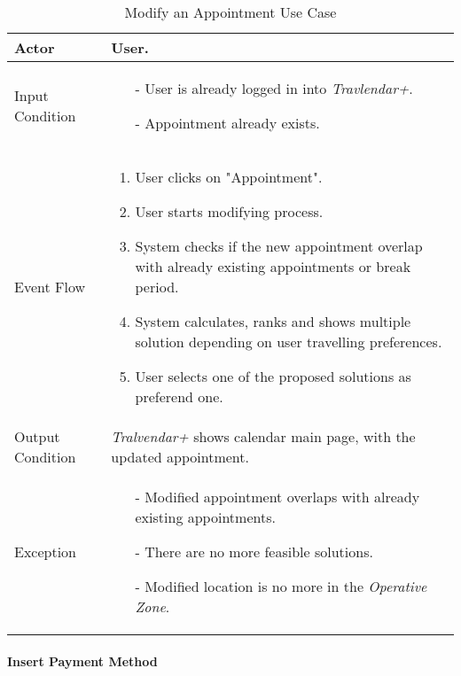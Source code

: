 		\begin{table}[H]
			\begin{tabular}{| l | p{} | }
				\hline
				\hline
				Actor	&		User. \\
				\hline
				Input Condition		&		\begin{itemize}
														\item[-] User is already logged in into \textit{Travlendar+}.
														\item[-] Appointment already exists.
													\end{itemize} \\
				\hline
				Event Flow		&		\begin{enumerate}
													\item User clicks on "Appointment".
													\item User starts modifying process.
													\item System checks if the new appointment overlap with already existing appointments or break period.
													\item	 System calculates, ranks and shows multiple solution depending on user travelling preferences.
													\item User selects one of the proposed solutions as preferend one.
												\end{enumerate} \\
				\hline
				Output Condition		&		\textit{Tralvendar+} shows calendar main page, with the updated appointment. \\
				\hline		
				Exception		&		\begin{itemize}
												\item[-] Modified appointment overlaps with already existing appointments.
												\item[-] There are no more feasible solutions.
												\item[-] Modified location is no more in the \textit{Operative Zone}.
											\end{itemize} \\
				\hline
				\hline
			\end{tabular}
			\caption{Modify an Appointment Use Case}
		\end{table}
		

	\paragraph{Insert Payment Method}
	
